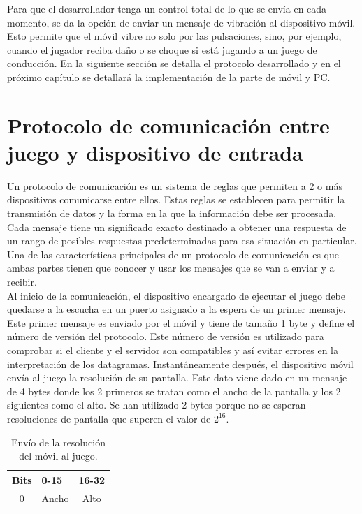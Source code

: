 Para que el desarrollador tenga un control total de lo que se env\'ia en cada momento, se da la opci\'on de enviar un mensaje de vibraci\'on al dispositivo m\'ovil. Esto permite que el m\'ovil vibre no solo por las pulsaciones, sino, por ejemplo, cuando el jugador reciba da\~no o se choque si est\'a jugando a un juego de conducci\'on. En la siguiente secci\'on se detalla el protocolo desarrollado y en el pr\'oximo cap\'itulo se detallar\'a la implementaci\'on de la parte de m\'ovil y PC.


\section{Protocolo de comunicaci\'on entre juego y dispositivo de entrada}

Un protocolo de comunicaci\'on es un sistema de reglas que permiten a 2 o m\'as dispositivos comunicarse entre ellos. Estas reglas se establecen para permitir la transmisi\'on de datos y la forma en la que la informaci\'on debe ser procesada. Cada mensaje tiene un significado exacto destinado a obtener una respuesta de un rango de posibles respuestas predeterminadas para esa situaci\'on en particular. Una de las caracter\'isticas principales de un protocolo de comunicaci\'on es que ambas partes tienen que conocer y usar los mensajes que se van a enviar y a recibir. \\

Al inicio de la comunicaci\'on, el dispositivo encargado de ejecutar el juego debe quedarse a la escucha en un puerto asignado a la espera de un primer mensaje. Este primer mensaje es enviado por el m\'ovil y tiene de tama\~no 1 byte y define el n\'umero de versi\'on del protocolo. Este n\'umero de versi\'on es utilizado para comprobar si el cliente y el servidor son compatibles y as\'i evitar errores en la interpretaci\'on de los datagramas. Instant\'aneamente despu\'es, el dispositivo m\'ovil env\'ia al juego la resoluci\'on de su pantalla. Este dato viene dado en un mensaje de 4 bytes donde los 2 primeros se tratan como el ancho de la pantalla y los 2 siguientes como el alto. Se  han utilizado 2 bytes porque no se esperan resoluciones de pantalla que superen el valor de $2^{16}$. \\

\begin{table}[h!]
\centering
\begin{tabular}{|l|l|l|} 
\hline
Bits                    & 0-15                   & 16-32                   \\
\hline
\multicolumn{1}{|c|}{0} & \multicolumn{1}{c|}{Ancho} & \multicolumn{1}{c|}{Alto}  \\
\hline
\end{tabular}
\caption{Env\'io de la resoluci\'on del m\'ovil al juego.}
\label{table:1}
\end{table}


